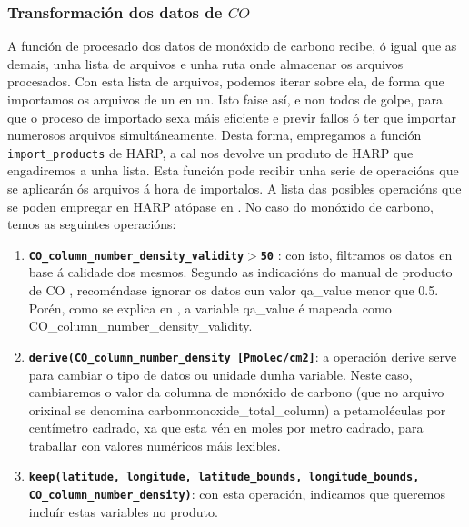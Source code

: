 \subsubsection{Transformación dos datos de $CO$}
A función de procesado dos datos de monóxido de carbono recibe, ó igual que as demais, unha lista de arquivos e unha ruta onde almacenar os arquivos procesados. Con esta lista de arquivos, podemos
iterar sobre ela, de forma que importamos os arquivos de un en un. Isto faise así, e non todos de golpe, para que o proceso de importado sexa máis eficiente e previr fallos ó ter que importar
numerosos arquivos simultáneamente. Desta forma, empregamos a función \texttt{import\_products} de HARP, a cal nos devolve un produto de HARP que engadiremos a unha lista. Esta función pode recibir
unha serie de operacións que se aplicarán ós arquivos á hora de importalos. A lista das posibles operacións que se poden empregar en HARP atópase en \cite{HARPdoc}. No caso do monóxido de carbono,
temos as seguintes operacións:
\begin{enumerate}
    \item \texttt{\textbf{CO\_column\_number\_density\_validity$>$50}} : con isto, filtramos os datos en base á calidade dos mesmos. Segundo as indicacións do manual de producto de CO \cite{COmanual},
    recoméndase ignorar os datos cun valor qa\_value menor que 0.5. Porén, como se explica en \cite{HARPCO}, a variable qa\_value é mapeada como CO\_column\_number\_density\_validity.
    \item \texttt{\textbf{derive(CO\_column\_number\_density [Pmolec/cm2]}}: a operación derive serve para cambiar o tipo de datos ou unidade dunha variable. Neste caso, cambiaremos o valor da
    columna de monóxido de carbono (que no arquivo orixinal se denomina carbonmonoxide\_total\_column) a petamoléculas por centímetro cadrado, xa que esta vén en moles por metro cadrado, para
    traballar con valores numéricos máis lexibles.
    \item \texttt{\textbf{keep(latitude, longitude, latitude\_bounds, longitude\_bounds, \break CO\_column\_number\_density)}}: con esta operación, indicamos que queremos incluír estas variables no
    produto.
\end{enumerate}


